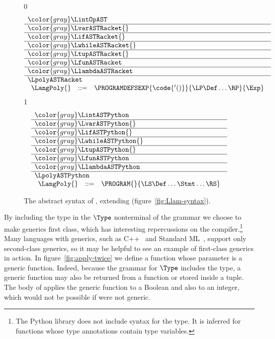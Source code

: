 \documentclass[7x10]{TimesAPriori_MIT}%
\newcommand{\gray}[1]{{\color{gray} #1}}
\def\racketEd{0}
\def\pythonEd{1}
\def\edition{1}
\newcommand{\pythonColor}[0]{}
\numberwithin{theorem}{chapter}
\numberwithin{definition}{chapter}
\numberwithin{equation}{chapter}
\begin{document}
\begin{figure}[tp]
\centering
\begin{tcolorbox}[colback=white]
\footnotesize
{\if\edition\racketEd
\[
\begin{array}{l}
  \gray{\LintOpAST} \\ \hline
  \gray{\LvarASTRacket{}} \\ \hline
  \gray{\LifASTRacket{}} \\ \hline
  \gray{\LwhileASTRacket{}} \\ \hline
  \gray{\LtupASTRacket{}} \\ \hline
  \gray{\LfunASTRacket} \\ \hline
  \gray{\LlambdaASTRacket} \\ \hline
  \LpolyASTRacket \\
\begin{array}{lcl}
  \LangPoly{} &::=& \PROGRAMDEFSEXP{\code{'()}}{\LP\Def\ldots\RP}{\Exp}
\end{array}
\end{array}
\]
\fi}
{\if\edition\pythonEd\pythonColor
\[
\begin{array}{l}
  \gray{\LintASTPython} \\ \hline
  \gray{\LvarASTPython{}} \\ \hline
  \gray{\LifASTPython{}} \\ \hline
  \gray{\LwhileASTPython{}} \\ \hline
  \gray{\LtupASTPython{}} \\ \hline
  \gray{\LfunASTPython} \\ \hline
  \gray{\LlambdaASTPython} \\ \hline
  \LpolyASTPython \\
  \begin{array}{lcl}
  \LangPoly{} &::=& \PROGRAM{}{\LS \Def \ldots \Stmt \ldots \RS}
  \end{array}
\end{array}
\]
\fi}
\end{tcolorbox}

\caption{The abstract syntax of \LangPoly{}, extending \LangLam{}
    (figure~\ref{fig:Llam-syntax}).}
\label{fig:Lpoly-syntax}
\end{figure}

By including the  type in the $\Type$ nonterminal of the
grammar we choose to make generics first class, which has interesting
repercussions on the compiler.\footnote{The Python  library does
not include syntax for the  type. It is inferred for functions whose
type annotations contain type variables.}  Many languages with generics, such as
C++~\citep{stroustrup88:_param_types} and Standard
ML~\citep{Milner:1990fk}, support only second-class generics, so it
may be helpful to see an example of first-class generics in action. In
figure~\ref{fig:apply-twice} we define a function 
whose parameter is a generic function. Indeed, because the grammar for
$\Type$ includes the  type, a generic function may also be
returned from a function or stored inside a tuple. The body of
 applies the generic function  to a Boolean
and also to an integer, which would not be possible if  were
not generic.
\end{document}
